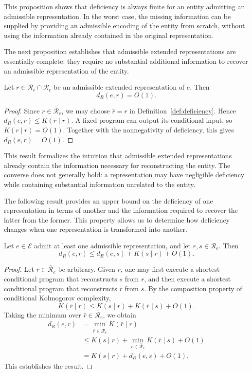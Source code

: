 This proposition shows that deficiency is always finite for an entity admitting an admissible representation. In the worst case, the missing information can be supplied by providing an admissible encoding of the entity from scratch, without using the information already contained in the original representation.

The next proposition establishes that admissible extended representations are essentially complete: they require no substantial additional information to recover an admissible representation of the entity.

\begin{proposition}
\label{prop:deficiency_admissible}
Let $r\in\bar{\mathcal R}_e\cap\mathcal R_e$ be an admissible extended representation of $e$. Then
\[
d_R(e,r)=O(1).
\]
\end{proposition}
\begin{proof}
Since $r\in\bar{\mathcal R}_e$, we may choose $\bar r=r$ in Definition~\ref{def:deficiency}. Hence $d_R(e,r)\le K(r\mid r)$. A fixed program can output its conditional input, so $K(r\mid r)=O(1)$. Together with the nonnegativity of deficiency, this gives $d_R(e,r)=O(1)$.
\end{proof}

This result formalizes the intuition that admissible extended representations already contain the information necessary for reconstructing the entity. The converse does not generally hold: a representation may have negligible deficiency while containing substantial information unrelated to the entity.

The following result provides an upper bound on the deficiency of one representation in terms of another and the information required to recover the latter from the former. This property allows us to determine how deficiency changes when one representation is transformed into another.

\begin{proposition}
\label{prop:deficiency_triangle}
Let $e\in\mathcal E$ admit at least one admissible representation, and let $r,s\in\mathcal R_e$. Then
\[
d_R(e,r) \le d_R(e,s) + K(s\mid r) + O(1).
\]
\end{proposition}
\begin{proof}
Let $\bar r\in\bar{\mathcal R}_e$ be arbitrary. Given $r$, one may first execute a shortest conditional program that reconstructs $s$ from $r$, and then execute a shortest conditional program that reconstructs $\bar r$ from $s$. By the composition property of conditional Kolmogorov complexity,
\[
K(\bar r\mid r) \le K(s\mid r)+K(\bar r\mid s)+O(1).
\]
Taking the minimum over $\bar r\in\bar{\mathcal R}_e$, we obtain
\[
\begin{aligned}
d_R(e,r)
&= \min_{\bar r\in\bar{\mathcal R}_e}K(\bar r\mid r)\\
&\le K(s\mid r) + \min_{\bar r\in\bar{\mathcal R}_e}K(\bar r\mid s) +O(1)\\
&= K(s\mid r)+d_R(e,s)+O(1).
\end{aligned}
\]
This establishes the result.
\end{proof}

